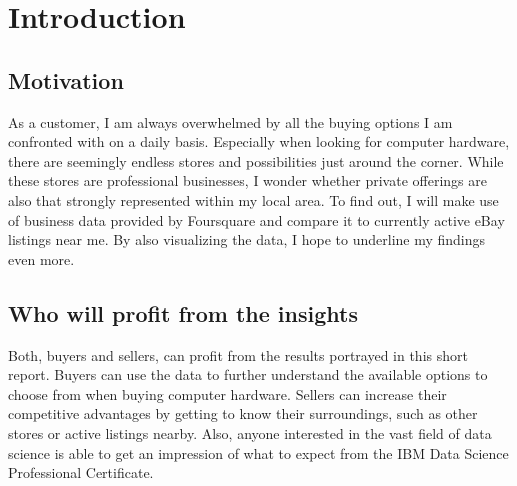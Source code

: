 \chapter{Introduction}
\section{Motivation}
As a customer, I am always overwhelmed by all the buying options I am confronted with on a daily basis. Especially when looking for computer hardware, there are seemingly endless stores and possibilities just around the corner. While these stores are professional businesses, I wonder whether private offerings are also that strongly represented within my local area. To find out, I will make use of business data provided by Foursquare and compare it to currently active eBay listings near me. By also visualizing the data, I hope to underline my findings even more.
\section{Who will profit from the insights}
Both, buyers and sellers, can profit from the results portrayed in this short report. Buyers can use the data to further understand the available options to choose from when buying computer hardware. Sellers can increase their competitive advantages by getting to know their surroundings, such as other stores or active listings nearby. Also, anyone interested in the vast field of data science is able to get an impression of what to expect from the IBM Data Science Professional Certificate.